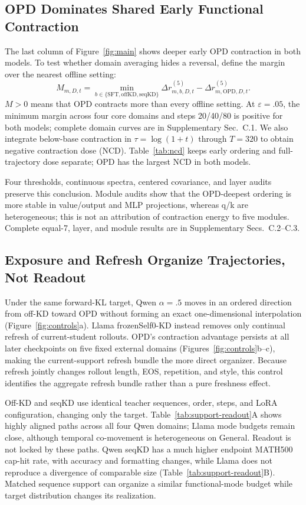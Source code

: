 \subsection{OPD Dominates Shared Early Functional Contraction}

The last column of Figure~\ref{fig:main} shows deeper early OPD contraction in both
models. To test whether domain averaging hides a reversal, define the margin over the
nearest offline setting:
\begin{equation}
M_{m,D,t}
=\min_{b\in\{\mathrm{SFT,offKD,seqKD}\}}\Delta r_{m,b,D,t}^{(5)}
-\Delta r_{m,\mathrm{OPD},D,t}^{(5)}.
\end{equation}
$M>0$ means that OPD contracts more than every offline setting. At
$\varepsilon=.05$, the minimum margin across four core domains and steps 20/40/80 is
positive for both models; complete domain curves are in Supplementary Sec.~C.1. We also
integrate below-base contraction in $\tau=\log(1+t)$ through $T=320$ to obtain negative
contraction dose (NCD). Table~\ref{tab:ncd} keeps early ordering and full-trajectory dose
separate; OPD has the largest NCD in both models.

Four thresholds, continuous spectra, centered covariance, and layer audits preserve this
conclusion. Module audits show that the OPD-deepest ordering is more stable in
value/output and MLP projections, whereas q/k are heterogeneous; this is not an
attribution of contraction energy to five modules. Complete equal-7, layer, and module
results are in Supplementary Secs.~C.2--C.3.

\subsection{Exposure and Refresh Organize Trajectories, Not Readout}

Under the same forward-KL target, Qwen $\alpha=.5$ moves in an ordered direction from
off-KD toward OPD without forming an exact one-dimensional interpolation
(Figure~\ref{fig:controls}a). Llama frozenSelf0-KD instead removes only continual refresh
of current-student rollouts. OPD's contraction advantage persists at all later checkpoints
on five fixed external domains (Figures~\ref{fig:controls}b--c), making the
current-support refresh bundle the more direct organizer. Because refresh jointly changes
rollout length, EOS, repetition, and style, this control identifies the aggregate refresh
bundle rather than a pure freshness effect.

Off-KD and seqKD use identical teacher sequences, order, steps, and LoRA configuration,
changing only the target. Table~\ref{tab:support-readout}A shows highly aligned paths
across all four Qwen domains; Llama mode budgets remain close, although temporal
co-movement is heterogeneous on General. Readout is not locked by these paths. Qwen
seqKD has a much higher endpoint MATH500 cap-hit rate, with accuracy and formatting
changes, while Llama does not reproduce a divergence of comparable size
(Table~\ref{tab:support-readout}B). Matched sequence support can organize a similar
functional-mode budget while target distribution changes its realization.

